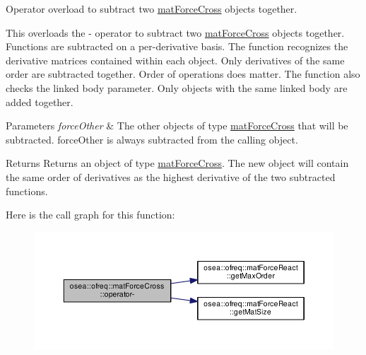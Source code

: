 Operator overload to subtract two \hyperlink{classosea_1_1ofreq_1_1mat_force_cross}{mat\-Force\-Cross} objects together. 

This overloads the -\/ operator to subtract two \hyperlink{classosea_1_1ofreq_1_1mat_force_cross}{mat\-Force\-Cross} objects together. Functions are subtracted on a per-\/derivative basis. The function recognizes the derivative matrices contained within each object. Only derivatives of the same order are subtracted together. Order of operations does matter. The function also checks the linked body parameter. Only objects with the same linked body are added together. 
\begin{DoxyParams}{Parameters}
{\em force\-Other} & The other objects of type \hyperlink{classosea_1_1ofreq_1_1mat_force_cross}{mat\-Force\-Cross} that will be subtracted. force\-Other is always subtracted from the calling object. \\
\hline
\end{DoxyParams}
\begin{DoxyReturn}{Returns}
Returns an object of type \hyperlink{classosea_1_1ofreq_1_1mat_force_cross}{mat\-Force\-Cross}. The new object will contain the same order of derivatives as the highest derivative of the two subtracted functions. 
\end{DoxyReturn}


Here is the call graph for this function\-:\nopagebreak
\begin{figure}[H]
\begin{center}
\leavevmode
\includegraphics[width=350pt]{classosea_1_1ofreq_1_1mat_force_cross_af22b49c1536dc753f99b34a3eba1c8e7_cgraph}
\end{center}
\end{figure}


